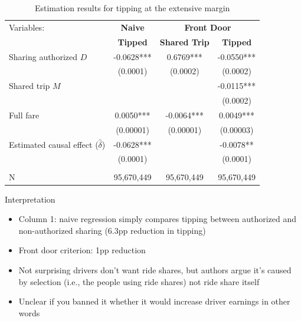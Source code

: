\documentclass{beamer}
\begin{document}
\begin{frame}[shrink=20]

  \begin{table}[htb]
    \small
    \caption{Estimation results for tipping at the extensive margin}
    \label{tab:screening}
    \centering
    \begin{tabular}{l*{3}{c}}
      \toprule
      \multicolumn{1}{l}{Variables: }&
      \multicolumn{1}{c}{\textbf{Naive }}&
      \multicolumn{2}{c}{\textbf{Front Door }}\\
      \multicolumn{1}{l}{}&
      \multicolumn{1}{c}{\textbf{Tipped}}&
      \multicolumn{1}{c}{\textbf{Shared Trip }}&
      \multicolumn{1}{c}{\textbf{Tipped}}\\
      \midrule
      Sharing authorized $D$                       & -0.0628*** & 0.6769***  & -0.0550*** \\
                                                   & (0.0001)   & (0.0002)   & (0.0002)   \\
      Shared trip $M$                              &            &            & -0.0115*** \\
                                                   &            &            & (0.0002)   \\
      Full fare                                    & 0.0050***  & -0.0064*** & 0.0049***  \\
                                                   & (0.00001)  & (0.00001)  & (0.00003)  \\

      \midrule

      Estimated causal effect ($\widehat{\delta}$) & -0.0628*** &            & -0.0078**  \\
                                                   & (0.0001)   &            & (0.0001)   \\
      \\
      \midrule
      N                                            & 95,670,449 & 95,670,449 & 95,670,449 \\
      \bottomrule
    \end{tabular}
  \end{table}
\end{frame}

\begin{frame}{Interpretation}

  \begin{itemize}
    \item Column 1: naive regression simply compares tipping between authorized and non-authorized sharing (6.3pp reduction in tipping)
    \item Front door criterion: 1pp reduction
    \item Not surprising drivers don't want ride shares, but authors argue it's caused by selection (i.e., the people using ride shares) not ride share itself
    \item Unclear if you banned it whether it would increase driver earnings in other words
  \end{itemize}

\end{frame}
\end{document}

